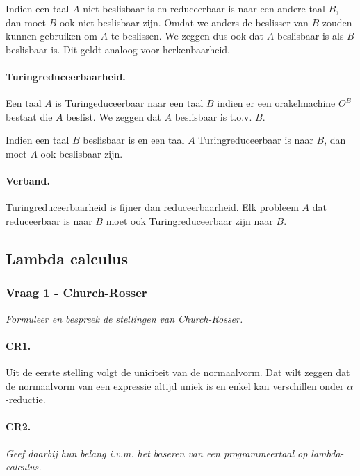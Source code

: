 Indien een taal $A$ niet-beslisbaar is en reduceerbaar is naar een andere taal $B$, dan moet $B$ ook niet-beslisbaar zijn. Omdat we anders de beslisser van $B$ zouden kunnen gebruiken om $A$ te beslissen. We zeggen dus ook dat $A$ beslisbaar is als $B$ beslisbaar is. Dit geldt analoog voor herkenbaarheid.

\paragraph{Turingreduceerbaarheid.} Een taal $A$ is Turingeduceerbaar naar een taal $B$ indien er een orakelmachine $O^B$ bestaat die $A$ beslist. We zeggen dat $A$ beslisbaar is t.o.v. $B$.

Indien een taal $B$ beslisbaar is en een taal $A$ Turingreduceerbaar is naar $B$, dan moet $A$ ook beslisbaar zijn.

\paragraph{Verband.} Turingreduceerbaarheid is fijner dan reduceerbaarheid. Elk probleem $A$ dat reduceerbaar is naar $B$ moet ook Turingreduceerbaar zijn naar $B$.

\subsection{Lambda calculus}

\subsubsection{Vraag 1 - Church-Rosser}

\textit{Formuleer en bespreek de stellingen van Church-Rosser.}

\paragraph{CR1.} 

Uit de eerste stelling volgt de uniciteit van de normaalvorm. Dat wilt zeggen dat de normaalvorm van een expressie altijd uniek is en enkel kan verschillen onder $\alpha$-reductie.

\paragraph{CR2.} 

\textit{Geef daarbij hun belang i.v.m. het baseren van een programmeertaal op lambda-calculus.}

